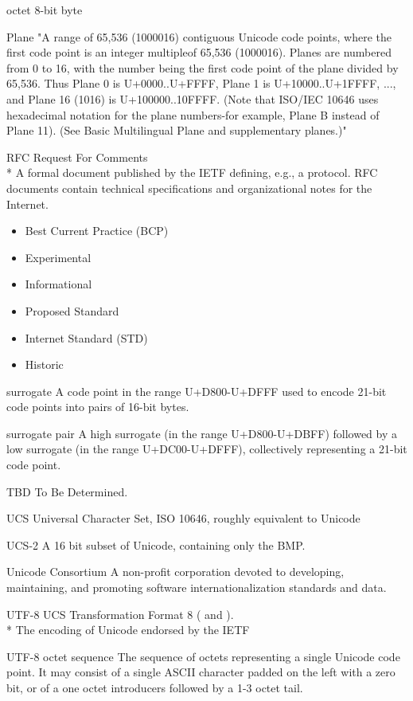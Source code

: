 \documentclass[b4paper]{article}
\begin{document}
\begin{definition}
\item [octet] 8-bit byte
\item [Plane] "A range of 65,536 (1000016) contiguous Unicode code
points, where the first code point is an integer multipleof 65,536
(1000016). Planes are numbered from 0 to 16, with the number being the
first code point of the plane divided by 65,536. Thus Plane 0 is
U+0000..U+FFFF, Plane 1 is U+10000..U+1FFFF, ..., and Plane 16 (1016)
is U+100000..10FFFF. (Note that ISO/IEC 10646 uses hexadecimal
notation for the plane numbers-for example, Plane B instead of Plane
11). (See Basic Multilingual Plane and supplementary planes.)"
\item [RFC] Request For Comments
\\*
A formal document published by the IETF defining, e.g., a protocol.
RFC documents contain technical specifications and organizational notes for the Internet.
\begin{itemize}
  \item Best Current Practice (BCP)
  \item Experimental
  \item Informational
  \item Proposed Standard
  \item Internet Standard (STD)
  \item Historic
\end{itemize}
\item [surrogate] A code point in the range U+D800-U+DFFF used to
encode 21-bit code points into pairs of 16-bit bytes.
\item [surrogate pair] A high surrogate (in the range U+D800-U+DBFF)
followed by a low surrogate (in the range U+DC00-U+DFFF),
collectively representing a 21-bit code point.
\item [TBD] To Be Determined.
\item [UCS] Universal Character Set, ISO 10646, roughly equivalent to Unicode
\item [UCS-2] A 16 bit subset of Unicode, containing only the BMP.
\item [Unicode Consortium] A non-profit corporation devoted to
developing, maintaining, and promoting software internationalization standards and data.
\item [UTF-8] UCS Transformation Format 8
(\cite{Unicode3.9} and \cite{RFC 3629}).
\\*
The encoding of Unicode endorsed by the IETF
\item [UTF-8 octet sequence]
The sequence of octets representing a single Unicode code point.
It may consist of a single ASCII character padded on the left with a zero bit,
or of a one octet introducers followed by a 1-3 octet tail.


\end{definition}
\end{document}
